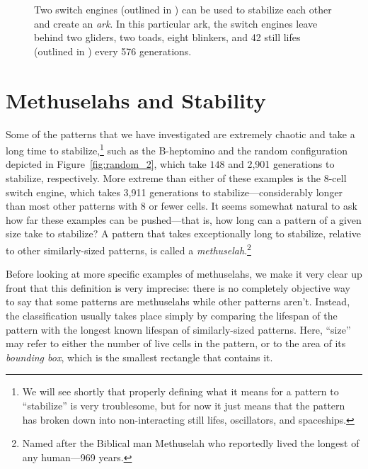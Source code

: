\begin{figure}[!htb]
	\centering{}
	\caption{Two switch engines (outlined in ) can be used to stabilize each other and create an \emph{ark}. In this particular ark, the switch engines leave behind two gliders, two toads, eight blinkers, and 42 still lifes (outlined in ) every 576 generations.}\label{fig:ark_1}
\end{figure}


\section{Methuselahs and Stability}\label{sec:methuselah}

Some of the patterns that we have investigated are extremely chaotic and take a long time to stabilize,\footnote{We will see shortly that properly defining what it means for a pattern to ``stabilize'' is very troublesome, but for now it just means that the pattern has broken down into non-interacting still lifes, oscillators, and spaceships.} such as the B-heptomino and the random configuration depicted in Figure~\ref{fig:random_2}, which take $148$ and 2,901 generations to stabilize, respectively. More extreme than either of these examples is the $8$-cell switch engine, which takes 3,911 generations to stabilize---considerably longer than most other patterns with $8$ or fewer cells. It seems somewhat natural to ask how far these examples can be pushed---that is, how long can a pattern of a given size take to stabilize? A pattern that takes exceptionally long to stabilize, relative to other similarly-sized patterns, is called a \emph{methuselah}.\footnote{Named after the Biblical man Methuselah who reportedly lived the longest of any human---969 years.}

Before looking at more specific examples of methuselahs, we make it very clear up front that this definition is very imprecise: there is no completely objective way to say that some patterns are methuselahs while other patterns aren't. Instead, the classification usually takes place simply by comparing the lifespan of the pattern with the longest known lifespan of similarly-sized patterns. Here, ``size'' may refer to either the number of live cells in the pattern, or to the area of its \emph{bounding box}, which is the smallest rectangle that contains it.

